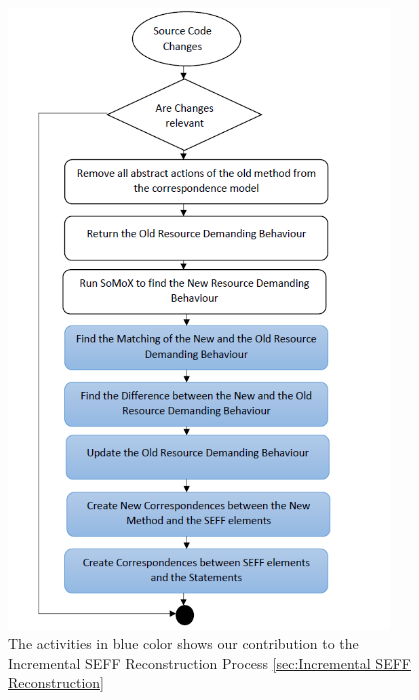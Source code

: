 \begin{figure}[h]
\centering
\includegraphics[width=0.9\textwidth]{figures/seff_reconst_extension_level2}
\caption{The activities in blue color shows our contribution to the Incremental SEFF Reconstruction Process \ref{sec:Incremental SEFF Reconstruction}}
\label{fig:seff_reconst_extension_level2}
\end{figure}

 
 
 